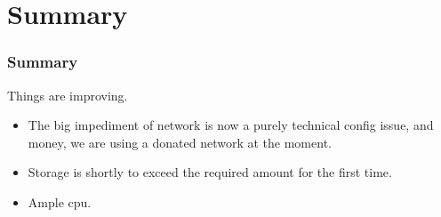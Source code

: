 \documentclass{beamer}
\begin{document}
\section{Summary}

\begin{frame}
    \frametitle{Summary}
    Things are improving.
    \begin{itemize}
        \item The big impediment of network is now a purely technical config issue, and money, we are using a donated network at the moment.
        \item Storage is shortly to exceed the required amount for the first time.
        \item Ample cpu.
    \end{itemize}
\end{frame}
\end{document}
